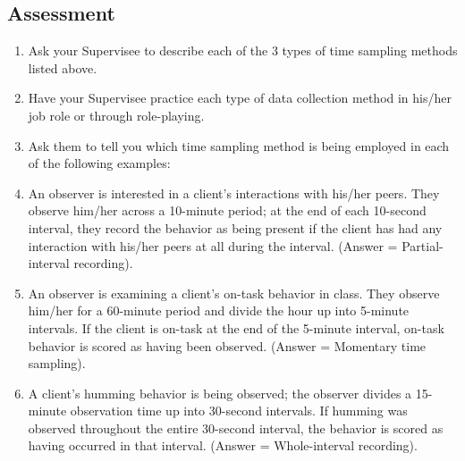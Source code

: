 \subsection{Assessment}
\begin{enumerate}
\item Ask your Supervisee to describe each of the 3 types of time sampling methods listed above.
\item Have your Supervisee practice each type of data collection method in his/her job role or through role-playing.
\item Ask them to tell you which time sampling method is being employed in each of the following examples:
\item An observer is interested in a client's interactions with his/her peers. They observe him/her across a 10-minute period; at the end of each 10-second interval, they record the behavior as being present if the client has had any interaction with his/her peers at all during the interval. (Answer = Partial-interval recording).
\item An observer is examining a client's on-task behavior in class. They observe him/her for a 60-minute period and divide the hour up into 5-minute intervals. If the client is on-task at the end of the 5-minute interval, on-task behavior is scored as having been observed. (Answer = Momentary time sampling). 
\item A client's humming behavior is being observed; the observer divides a 15-minute observation time up into 30-second intervals. If humming was observed throughout the entire 30-second interval, the behavior is scored as having occurred in that interval. (Answer = Whole-interval recording). 
\end{enumerate}
%
